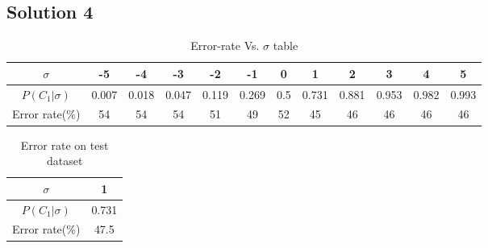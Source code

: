 \subsection*{Solution 4}
\begin{table}[h!]
\begin{center}
	\begin{tabular}{||c | c | c | c | c | c | c | c | c | c | c | c ||} 
		\hline
		$\sigma$ & -5 & -4 & -3 & -2 & -1 & 0 & 1 & 2 & 3 & 4 & 5 \\ [0.5ex] 
		\hline\hline
		$P(C_1|\sigma)$ & 0.007 & 0.018 & 0.047 & 0.119 & 0.269 & 0.5 & 0.731 & 0.881 & 0.953 & 0.982 & 0.993 \\
		\hline
		Error rate(\%) & 54 & 54 & 54 & 51 & 49 & 52 & 45 & 46 & 46 & 46 & 46 \\ [1ex]
		\hline
	\end{tabular}
\end{center}
\caption{Error-rate Vs. $\sigma$ table}
\end{table}
\begin{table}[h!]
	\begin{center}
		\begin{tabular}{||c|c||}
			\hline
			$\sigma$ & 1 \\ [0.5ex]
			\hline\hline
			$P(C_1|\sigma)$ & 0.731 \\
			\hline
			Error rate(\%) & 47.5 \\ [1ex]
			\hline
		\end{tabular}
	\end{center}
\caption{Error rate on test dataset}
\end{table}